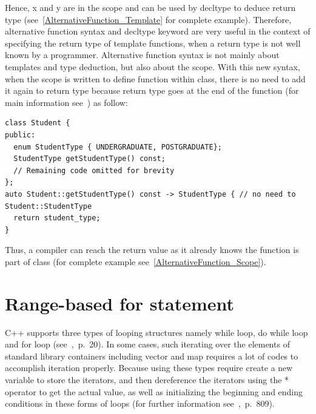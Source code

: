 \documentclass[11pt]{report}
\begin{document}
Hence, x and y are in the scope and can be used by decltype to deduce return type (see~\ref{AlternativeFunction_Template} for complete example). Therefore, alternative function syntax and decltype keyword are very useful in the context of specifying the return type of template functions, when a return type is not well known by a programmer. Alternative function syntax is not mainly about templates and type deduction, but also about the scope. With this new syntax, when the scope is written to define function within class, there is no need to add it again to return type because return type goes at the end of the function (for main information see~\cite{Allain:2011:FutureCpp}) as follow:
\begin{lstlisting}
class Student {
public:
  enum StudentType { UNDERGRADUATE, POSTGRADUATE};
  StudentType getStudentType() const;
  // Remaining code omitted for brevity
};
auto Student::getStudentType() const -> StudentType { // no need to Student::StudentType
  return student_type;
}
\end{lstlisting}
Thus, a compiler can reach the return value as it already knows the function is part of class (for complete example see~\ref{AlternativeFunction_Scope}).

\section{Range-based for statement}
\label{section: Range-based for statement}
C++ supports three types of looping structures namely while loop, do while loop and for loop (see~\cite{Gregorie:professionalcpp},~p.~20). In some cases, such iterating over the elements of standard library containers including vector and map requires a lot of codes to accomplish iteration properly. Because using these types require create a new variable to store the iterators, and then dereference the iterators using the * operator to get the actual value, as well as initializing the beginning and ending conditions in these forms of loops (for further information see~\cite{Horstmann:2008:BC},~p.~809).
\end{document}
